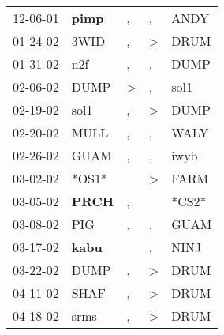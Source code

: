 \begin{supertabular}{p{0.07\textwidth}p{0.06\textwidth}p{0.02\textwidth}p{0.02\textwidth}p{0.06\textwidth}}
          12-06-01\textsuperscript{} &  \textbf{pimp\textsuperscript{}} &                , &                , &           ANDY\textsuperscript{} \\
          01-24-02\textsuperscript{} &           3WID\textsuperscript{} &                , &     \textgreater &           DRUM\textsuperscript{} \\
          01-31-02\textsuperscript{} &            n2f\textsuperscript{} &                , &                , &           DUMP\textsuperscript{} \\
          02-06-02\textsuperscript{} &           DUMP\textsuperscript{} &     \textgreater &                , &           sol1\textsuperscript{} \\
          02-19-02\textsuperscript{} &           sol1\textsuperscript{} &                , &     \textgreater &           DUMP\textsuperscript{} \\
          02-20-02\textsuperscript{} &           MULL\textsuperscript{} &                , &                , &           WALY\textsuperscript{} \\
          02-26-02\textsuperscript{} &           GUAM\textsuperscript{} &                , &                , &           iwyb\textsuperscript{} \\
          03-02-02\textsuperscript{} &                            *OS1* &                  &     \textgreater &           FARM\textsuperscript{} \\
          03-05-02\textsuperscript{} &  \textbf{PRCH\textsuperscript{}} &                , &                  &                            *CS2* \\
          03-08-02\textsuperscript{} &            PIG\textsuperscript{} &                , &                , &           GUAM\textsuperscript{} \\
          03-17-02\textsuperscript{} &  \textbf{kabu\textsuperscript{}} &                  &                , &           NINJ\textsuperscript{} \\
          03-22-02\textsuperscript{} &           DUMP\textsuperscript{} &                , &     \textgreater &           DRUM\textsuperscript{} \\
          04-11-02\textsuperscript{} &           SHAF\textsuperscript{} &                , &     \textgreater &           DRUM\textsuperscript{} \\
          04-18-02\textsuperscript{} &           srms\textsuperscript{} &                , &     \textgreater &           DRUM\textsuperscript{} \\

\end{supertabular}
